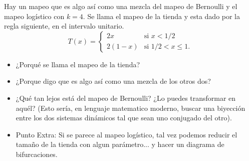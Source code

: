 \documentclass[12pt]{article}
\newenvironment{question}[2][Pregunta]{\begin{trivlist}
\item[\hskip \labelsep {\bfseries #1}\hskip \labelsep {\bfseries #2.}]}{\end{trivlist}}
\begin{document}
\begin{question}{3}
Hay un mapeo que es algo así como una mezcla del mapeo de Bernoulli y el mapeo
logístico con $k=4$. Se llama el mapeo de la tienda y esta dado por la regla siguiente,
en el intervalo unitario.
\begin{equation}
T(x) = \begin{cases} 2x &\mbox{si } x < 1/2 \\ 
2(1-x) & \mbox{si } 1/2 <x \leq 1. \end{cases} 
\end{equation}
\begin{itemize}
\item ¿Porqué se llama el mapeo de la tienda?
\item ¿Porque digo que es algo así como una mezcla de los otros dos?
\item ¿Qué tan lejos está del mapeo de Bernoulli? ¿Lo puedes transformar en aquél?
(Esto sería, en lenguaje matematico moderno, buscar una biyección entre los dos sistemas
dinámicos tal que sean uno conjugado del otro).
\item  Punto Extra: Si se parece al mapeo logístico, tal vez podemos reducir el tamaño de la tienda
con algun parámetro... y hacer un diagrama de bifurcaciones. 
\end{itemize}

\end{question}
\end{document}
